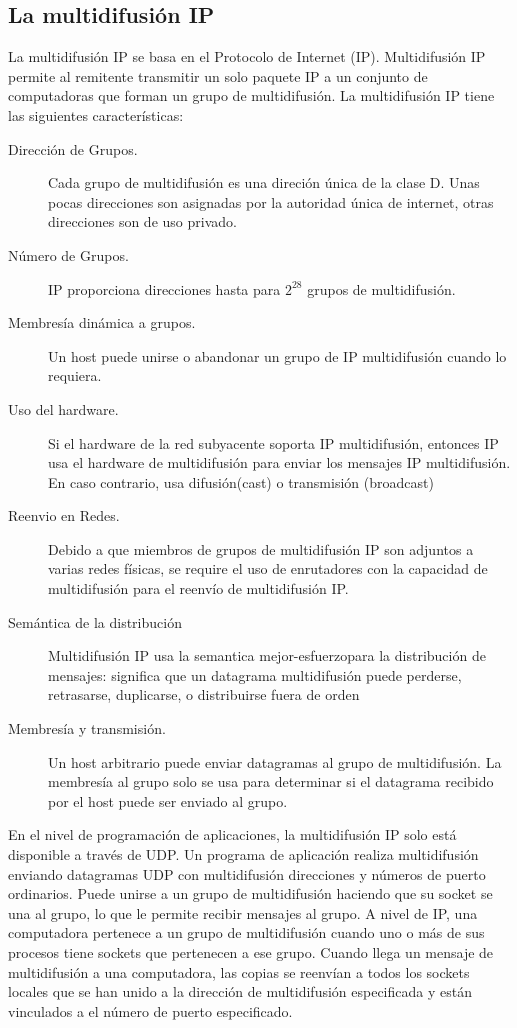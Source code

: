 \subsection{La multidifusión IP} La multidifusión IP  se basa en el Protocolo de Internet (IP).  Multidifusión IP permite al remitente transmitir un solo paquete IP a un conjunto de computadoras que forman un grupo de multidifusión. 
La multidifusión IP tiene las siguientes características:
\begin{description}
	\item[Dirección de Grupos.] Cada grupo de multidifusión es una direción única de la clase D. Unas pocas direcciones son asignadas por la autoridad única de internet, otras direcciones son de uso privado. 

	\item[Número de Grupos.] IP proporciona direcciones hasta para $2^{28}$ grupos de multidifusión.
	\item[Membresía dinámica a grupos.] Un host puede unirse o abandonar un grupo de IP multidifusión cuando lo requiera.
	\item[Uso del hardware.] Si el hardware de la red subyacente soporta IP multidifusión, entonces IP usa el hardware de multidifusión para enviar los mensajes IP multidifusión. En caso contrario, usa difusión(cast) o transmisión (broadcast)
	\item[Reenvio en Redes.] Debido a que miembros de grupos de multidifusión IP son adjuntos a varias redes físicas, se require el uso de enrutadores con la capacidad de multidifusión para el reenvío de multidifusión IP.
	\item[Semántica de la distribución] Multidifusión IP usa la \gls{semantica  mejor-esfuerzo}para la distribución de mensajes: significa que un datagrama multidifusión puede perderse, retrasarse, duplicarse, o distribuirse fuera de orden  
	\item[Membresía y transmisión.] Un host arbitrario puede enviar datagramas al grupo de multidifusión. La membresía al grupo solo se usa para determinar si el datagrama recibido por el host puede ser enviado al grupo.
\end{description}



En el nivel de programación de aplicaciones, la multidifusión IP solo está disponible a través de UDP. 
Un  programa de aplicación realiza multidifusión enviando datagramas UDP con multidifusión  direcciones y números de puerto ordinarios. Puede unirse a un grupo de multidifusión haciendo que su socket se una  al grupo, lo que le permite recibir mensajes al grupo. A nivel de IP, una computadora pertenece a un grupo de multidifusión cuando uno o más de sus procesos tiene sockets que pertenecen  a ese grupo. Cuando llega un mensaje de multidifusión a una computadora, las copias se reenvían a  todos los sockets locales que se han unido a la dirección de multidifusión especificada y están vinculados a
el número de puerto especificado. 



